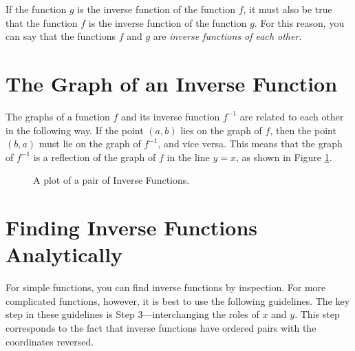 If the function $g$ is the inverse function of the function $f$, it must also be true that the function $f$ is the inverse function of the function $g$. For this reason, you can say that the functions $f$ and $g$ are \textit{inverse functions of each other}.

\section{The Graph of an Inverse Function}
The graphs of a function $f$ and its inverse function $f^{-1}$ are related to each other in the following way. If the point $(a,b)$ lies on the graph of $f$, then the point $(b,a)$ must lie on the graph of $f^{-1}$, and vice versa. This means that the graph of $f^{-1}$ is a reflection of the graph of $f$ in the line $y = x$, as shown in Figure \ref{plot:inv func}.

\begin{figure}[H]
    \centering
    \caption{A plot of a pair of Inverse Functions.}
    \label{plot:inv func}
\end{figure}


\section{Finding Inverse Functions Analytically}
For simple functions, you can find inverse functions by inspection. For more complicated functions, however, it is best to use the following guidelines. The key step in these guidelines is Step 3—interchanging the roles of $x$ and $y$. This step corresponds to the fact that inverse functions have ordered pairs with the coordinates reversed. \cite{ci}

